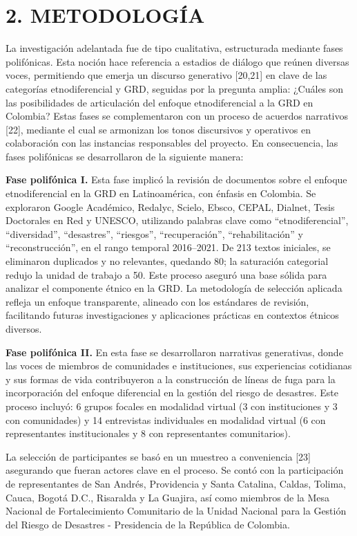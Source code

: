 \documentclass[
  spanish,
  letterpaper,
]{book}
\begin{document}

\chapter{2. METODOLOGÍA}\label{metodologuxeda}

La investigación adelantada fue de tipo cualitativa, estructurada
mediante fases polifónicas. Esta noción hace referencia a estadios de
diálogo que reúnen diversas voces, permitiendo que emerja un discurso
generativo {[}20,21{]} en clave de las categorías etnodiferencial y GRD,
seguidas por la pregunta amplia: ¿Cuáles son las posibilidades de
articulación del enfoque etnodiferencial a la GRD en Colombia? Estas
fases se complementaron con un proceso de acuerdos narrativos {[}22{]},
mediante el cual se armonizan los tonos discursivos y operativos en
colaboración con las instancias responsables del proyecto. En
consecuencia, las fases polifónicas se desarrollaron de la siguiente
manera:

\textbf{Fase polifónica I.} Esta fase implicó la revisión de documentos
sobre el enfoque etnodiferencial en la GRD en Latinoamérica, con énfasis
en Colombia. Se exploraron Google Académico, Redalyc, Scielo, Ebsco,
CEPAL, Dialnet, Tesis Doctorales en Red y UNESCO, utilizando palabras
clave como ``etnodiferencial'', ``diversidad'', ``desastres'',
``riesgos'', ``recuperación'', ``rehabilitación'' y ``reconstrucción'',
en el rango temporal 2016--2021. De 213 textos iniciales, se eliminaron
duplicados y no relevantes, quedando 80; la saturación categorial redujo
la unidad de trabajo a 50. Este proceso aseguró una base sólida para
analizar el componente étnico en la GRD. La metodología de selección
aplicada refleja un enfoque transparente, alineado con los estándares de
revisión, facilitando futuras investigaciones y aplicaciones prácticas
en contextos étnicos diversos.

\textbf{Fase polifónica II.} En esta fase se desarrollaron narrativas
generativas, donde las voces de miembros de comunidades e instituciones,
sus experiencias cotidianas y sus formas de vida contribuyeron a la
construcción de líneas de fuga para la incorporación del enfoque
diferencial en la gestión del riesgo de desastres. Este proceso incluyó:
6 grupos focales en modalidad virtual (3 con instituciones y 3 con
comunidades) y 14 entrevistas individuales en modalidad virtual (6 con
representantes institucionales y 8 con representantes comunitarios).

La selección de participantes se basó en un muestreo a conveniencia
{[}23{]} asegurando que fueran actores clave en el proceso. Se contó con
la participación de representantes de San Andrés, Providencia y Santa
Catalina, Caldas, Tolima, Cauca, Bogotá D.C., Risaralda y La Guajira,
así como miembros de la Mesa Nacional de Fortalecimiento Comunitario de
la Unidad Nacional para la Gestión del Riesgo de Desastres - Presidencia
de la República de Colombia.
\end{document}
